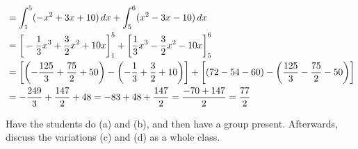 \documentclass[]{ximera}
\begin{document}
\begin{problem}
\begin{enumerate}
\begin{freeResponse}
\begin{align*}
			&= \int_1^5 (-x^2 + 3x + 10) \,d x + \int_5^6 (x^2 - 3x - 10) \,d x  \\
			&= \bigg[ -\frac{1}{3} x^3 + \frac{3}{2} x^2 + 10x \bigg]_1^5 + \bigg[ \frac{1}{3} x^3 - \frac{3}{2} x^2 - 10x \bigg]_5^6  \\
			&= \left[ \left(- \frac{125}{3} + \frac{75}{2} + 50 \right) - \left( - \frac{1}{3} + \frac{3}{2} + 10 \right) \right] + \left[ \left( 72 - 54 - 60 \right) - \left( \frac{125}{3} - \frac{75}{2} - 50 \right) \right]  \\
			&= - \frac{249}{3} + \frac{147}{2} + 48  = -83 + 48 + \frac{147}{2} = \frac{-70 + 147}{2} = \frac{77}{2}  
			\end{align*}
		\end{freeResponse}
		
	\end{enumerate}
	
\end{problem}

\begin{instructorNotes}
Have the students do (a) and (b), and then have a group present.  
Afterwards, discuss the variations (c) and (d) as a whole class.
\end{instructorNotes}
\end{document}
